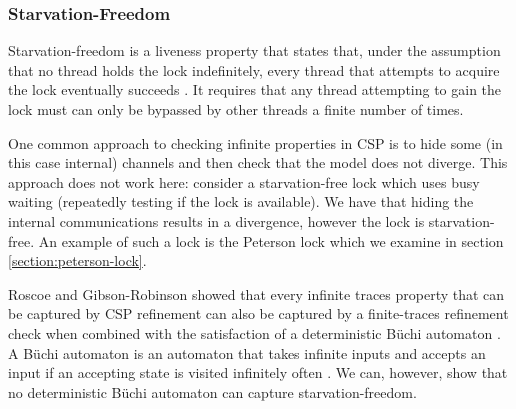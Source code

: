 

\subsubsection{Starvation-Freedom} \label{starvation-freedom}

Starvation-freedom is a liveness property that states that, under the assumption that no thread holds the lock indefinitely, every thread that attempts to acquire the lock eventually succeeds \cite{TAoMP}. It requires that any thread attempting to gain the lock must can only be bypassed by other threads a finite number of times.

One common approach to checking infinite properties in CSP is to hide some (in this case internal) channels and then check that the model does not diverge. This approach does not work here: consider a starvation-free lock which uses busy waiting (repeatedly testing if the lock is available). We have that hiding the internal communications results in a divergence, however the lock is starvation-free. An example of such a lock is the Peterson lock which we examine in section \ref{section:peterson-lock}.

Roscoe and Gibson-Robinson showed that every infinite traces property that can be captured by CSP refinement can also be captured by a finite-traces refinement check when combined with the satisfaction of a deterministic B{\"u}chi automaton \cite{RoscoeBuchi}. A B{\"u}chi automaton is an automaton that takes infinite inputs and accepts an input if an accepting state is visited infinitely often \cite{RoscoeBuchi}. We can, however, show that no deterministic B{\"u}chi automaton can capture starvation-freedom. 



